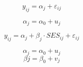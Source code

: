 \documentclass[a4paper,twoside,12pt,german]{article}
\begin{document}
\begin{equation}
y_{ij} = \alpha_{j} + \varepsilon_{ij}
\end{equation}

\begin{equation}
\alpha_{j} = \alpha_0 + u_{j}
\end{equation}


$$y_{ij} = \alpha_{j} + \beta_{j} \cdot SES_{ij} + \varepsilon_{ij}$$

$$\alpha_{j} = \alpha_0 + u_{j}$$
$$\beta{j} = \beta_0 + v_{j}$$
\end{document}
